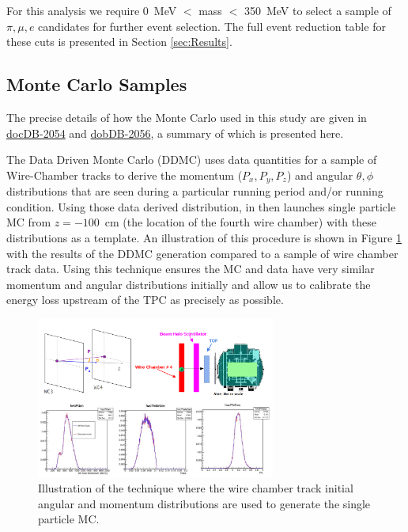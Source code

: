\begin{itemize}
For this analysis we require 0~MeV $<$ mass $<$ 350~MeV to select a sample of $\pi, \mu, e$ candidates for further event selection. The full event reduction table for these cuts is presented in Section \ref{sec:Results}.

\end{itemize}

\subsection{Monte Carlo Samples}\label{sec:MCSamples}
The precise details of how the Monte Carlo used in this study are given in \href{https://lartpc-docdb.fnal.gov:441/cgi-bin/ShowDocument?docid=2054}{docDB-2054} and  \href{https://lartpc-docdb.fnal.gov:441/cgi-bin/ShowDocument?docid=2056}{dobDB-2056}, a summary of which is presented here. 

The Data Driven Monte Carlo (DDMC) uses data quantities for a sample of Wire-Chamber tracks to derive the momentum ($P_x, P_y, P_z$) and angular $\theta, \phi$ distributions that are seen during a particular running period and/or running condition. Using those data derived distribution, in then launches single particle MC from $z = -100$~cm (the location of the fourth wire chamber) with these distributions as a template. An illustration of this procedure is shown in Figure \ref{fig:DDMC} with the results of the DDMC generation compared to a sample of wire chamber track data. Using this technique ensures the MC and data have very similar momentum and angular distributions initially and allow us to calibrate the energy loss upstream of the TPC as precisely as possible.

\begin{figure}[htb]
\centering
\includegraphics[width=0.70\textwidth]{images/DDMC.png}
\caption{Illustration of the technique where the wire chamber track initial angular and momentum distributions are used to generate the single particle MC.}
\label{fig:DDMC}
\end{figure}

